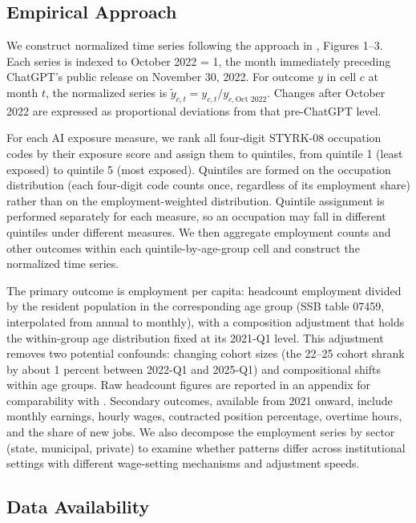 \subsection{Empirical Approach}\label{sec:data:approach}

We construct normalized time series following the approach in \citet{brynjolfsson2025}, Figures 1--3. Each series is indexed to October 2022 = 1, the month immediately preceding ChatGPT's public release on November 30, 2022. For outcome $y$ in cell $c$ at month $t$, the normalized series is $\tilde{y}_{c,t} = y_{c,t} / y_{c,\text{Oct } 2022}$. Changes after October 2022 are expressed as proportional deviations from that pre-ChatGPT level.

For each AI exposure measure, we rank all four-digit STYRK-08 occupation codes by their exposure score and assign them to quintiles, from quintile 1 (least exposed) to quintile 5 (most exposed). Quintiles are formed on the occupation distribution (each four-digit code counts once, regardless of its employment share) rather than on the employment-weighted distribution. Quintile assignment is performed separately for each measure, so an occupation may fall in different quintiles under different measures. We then aggregate employment counts and other outcomes within each quintile-by-age-group cell and construct the normalized time series.

The primary outcome is employment per capita: headcount employment divided by the resident population in the corresponding age group (SSB table 07459, interpolated from annual to monthly), with a composition adjustment that holds the within-group age distribution fixed at its 2021-Q1 level. This adjustment removes two potential confounds: changing cohort sizes (the 22--25 cohort shrank by about 1 percent between 2022-Q1 and 2025-Q1) and compositional shifts within age groups. Raw headcount figures are reported in an appendix for comparability with \citet{brynjolfsson2025}. Secondary outcomes, available from 2021 onward, include monthly earnings, hourly wages, contracted position percentage, overtime hours, and the share of new jobs. We also decompose the employment series by sector (state, municipal, private) to examine whether patterns differ across institutional settings with different wage-setting mechanisms and adjustment speeds.

\subsection*{Data Availability}

